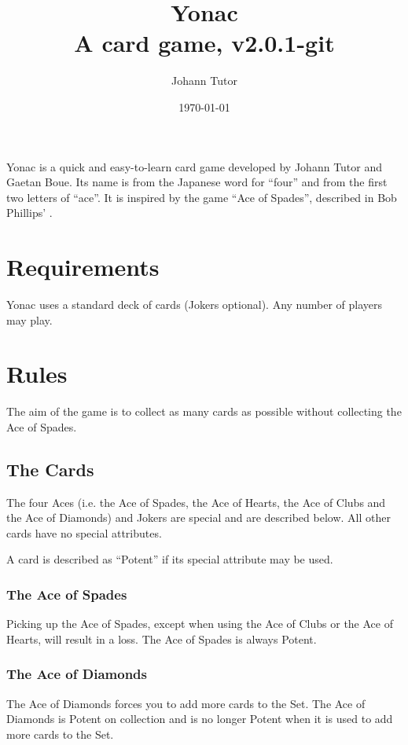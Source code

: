 \documentclass{article}
\newcommand\theversion{2.0.1-git}
\begin{document}
\title{Yonac\\ \large A card game, v\theversion}
\author{Johann Tutor}
\date{\today}
\maketitle

Yonac is a quick and easy-to-learn card game developed by Johann Tutor
and Gaetan Boue. Its name is from the Japanese word for ``four'' and
from the first two letters of ``ace''. It is inspired by the game ``Ace
of Spades'', described in Bob Phillips'
.

\tableofcontents

\newpage

\section{Requirements}

Yonac uses a standard deck of cards (Jokers optional). Any number of
players may play.

\section{Rules}

The aim of the game is to collect as many cards as possible without
collecting the Ace of Spades.

\subsection{The Cards}
\label{sec:cards}

The four Aces (i.e. the Ace of Spades, the Ace of Hearts, the Ace of Clubs and
the Ace of Diamonds) and Jokers are special and are described below. All other
cards have no special attributes.

A card is described as ``Potent'' if its special attribute may be used.

\subsubsection{The Ace of Spades}
Picking up the Ace of Spades, except when using the Ace of Clubs or the
Ace of Hearts, will result in a loss. The Ace of Spades is always Potent.

\subsubsection{The Ace of Diamonds}
The Ace of Diamonds forces you to add more cards to the Set. The Ace of
Diamonds is Potent on collection and is no longer Potent when it is used
to add more cards to the Set.
\end{document}
